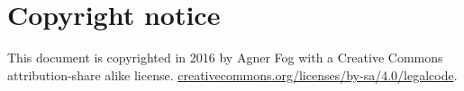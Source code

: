 \documentclass[forwardcom.tex]{subfiles}
\begin{document}
\RaggedRight

\chapter{Copyright notice}
This document is copyrighted in 2016 by Agner Fog with a Creative Commons attribution-share alike license.
\href{http://creativecommons.org/licenses/by-sa/4.0/legalcode}{creativecommons.org/licenses/by-sa/4.0/legalcode}.
\end{document}

